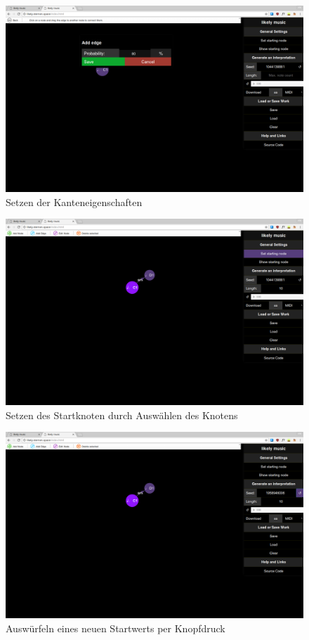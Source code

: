 \documentclass[a4paper,twocolumn]{article}
\begin{document}
\begin{figure}[H]
  \begin{center}
  \includegraphics[width=.7\textwidth]{screenshots/add-edge.png}
  \end{center}
  \caption{Setzen der Kanteneigenschaften}
\end{figure}

\begin{figure}[H]
  \begin{center}
  \includegraphics[width=.7\textwidth]{screenshots/starting-node.png}
  \end{center}
  \caption{Setzen des Startknoten durch Auswählen des Knotens}
\end{figure}

\begin{figure}[H]
  \begin{center}
  \includegraphics[width=.7\textwidth]{screenshots/new-seed.png}
  \end{center}
  \caption{Auswürfeln eines neuen Startwerts per Knopfdruck}
\end{figure}
\end{document}
